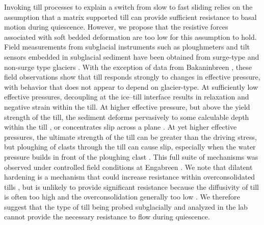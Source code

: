 \documentclass[draft,linenumbers]{agujournal}
\begin{document}
Invoking till processes to explain a switch from slow to fast sliding relies on the assumption that a matrix supported till can provide sufficient resistance to basal motion during quiescence. However, we propose that the resistive forces associated with soft bedded deformation are too low for this assumption to hold. Field measurements from subglacial instruments such as ploughmeters and tilt sensors embedded in subglacial sediment have been obtained from surge-type \citep{Blake1994,Fischer1994,Kavanaugh2006,Porter1997,Porter2001,Truffer2000,Truffer2006} and non-surge type glaciers \citep{Fischer2001,Iverson1994,Hooke1997,Mair2003,Iverson2007}. With the exception of data from Bakaninbreen \citep{Porter1997,Porter2001}, these field observations show that till responds strongly to changes in effective pressure, with behavior that does not appear to depend on glacier-type. At sufficiently low effective pressures, decoupling at the ice--till interface results in relaxation and negative strain within the till. At higher effective pressure, but above the yield strength of the till, the sediment deforms pervasively to some calculable depth within the till \citep[e.g.][]{Damsgaard2013,Iverson2001,Tulaczyk2000}, or concentrates slip across a plane \citep[e.g.][]{Iverson1998,Truffer2000}. At yet higher effective pressures, the ultimate strength of the till can be greater than the driving stress, but ploughing of clasts through the till can cause slip, especially when the water pressure builds in front of the ploughing clast \citep{Iverson1999,Iverson2007,Thomason2008,Tulaczyk2001}. This full suite of mechanisms was observed under controlled field conditions at Engabreen \citep{Iverson2007}. We note that dilatent hardening is a mechanism that could increase resistance within overconsolidated tills \citep[e.g.][]{Moore2002}, but is unlikely to provide significant resistance because the diffusivity of till is often too high \citep{Iverson2010} and the overconsolidation generally too low \citep{Tulaczyk2000}. We therefore suggest that the type of till being probed subglacially and analyzed in the lab cannot provide the necessary resistance to flow during quiescence. 
\end{document}
